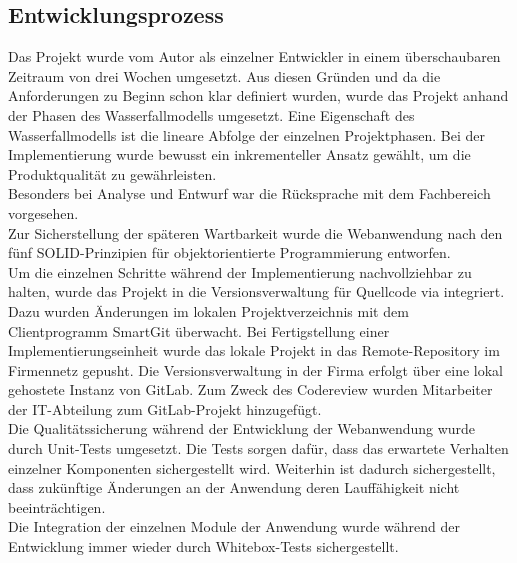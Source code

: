 \subsection{Entwicklungsprozess}
\label{sec:Entwicklungsprozess}
Das Projekt wurde vom Autor als einzelner Entwickler in einem überschaubaren Zeitraum 
von drei Wochen umgesetzt. Aus diesen Gründen und da die Anforderungen zu Beginn schon
klar definiert wurden, wurde das Projekt anhand der Phasen des Wasserfallmodells umgesetzt. 
Eine Eigenschaft des Wasserfallmodells ist die lineare Abfolge der einzelnen Projektphasen.
Bei der Implementierung wurde bewusst ein inkrementeller Ansatz gewählt, um die Produktqualität
zu gewährleisten.\\
Besonders bei Analyse und Entwurf war die Rücksprache mit dem Fachbereich vorgesehen.\\
Zur Sicherstellung der späteren Wartbarkeit wurde die Webanwendung nach den fünf SOLID-Prinzipien
für objektorientierte Programmierung entworfen.\\ 
Um die einzelnen Schritte während der Implementierung nachvollziehbar zu halten,
wurde das Projekt in die Versionsverwaltung für Quellcode via  integriert.
Dazu wurden Änderungen im lokalen Projektverzeichnis mit dem Clientprogramm SmartGit überwacht.
Bei Fertigstellung einer Implementierungseinheit wurde das lokale Projekt in das 
Remote-Repository im Firmennetz gepusht. Die Versionsverwaltung in der Firma erfolgt über eine lokal gehostete Instanz
von GitLab. Zum Zweck des Codereview wurden Mitarbeiter der IT-Abteilung zum GitLab-Projekt hinzugefügt.\\
Die Qualitätssicherung während der Entwicklung der Webanwendung wurde durch Unit-Tests umgesetzt. Die Tests 
sorgen dafür, dass das erwartete Verhalten einzelner Komponenten sichergestellt wird. Weiterhin ist dadurch 
sichergestellt, dass zukünftige Änderungen an der Anwendung deren Lauffähigkeit nicht beeinträchtigen.\\
Die Integration der einzelnen Module der Anwendung wurde während der Entwicklung immer wieder durch Whitebox-Tests
sichergestellt.
\clearpage